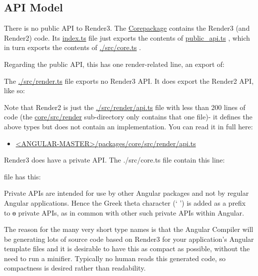 \subsection{API Model}

There is no public API to Render3. The
\url{Corepackage}
contains the Render3 (and
Render2) code. Its
\url{index.ts}
file just exports the contents of
\url{public_api.ts}
, which in
turn exports the contents of
\url{./src/core.ts}
.

Regarding the public API, this has one render-related line, an export of:



The
\url{./src/render.ts}
file exports no Render3 API. It does export the Render2 API, like
so:



Note that Render2 is just the
\url{./src/render/api.ts}
file with less than 200 lines of code
(the
\url{core/src/render}
sub-directory only contains that one file)- it defines the above
types but does not contain an implementation. You can read it in full here:

\begin{itemize}
  \item \href{https://github.com/angular/angular/blob/master/packages/core/src/render/api.ts}
        {<ANGULAR-MASTER>/packages/core/src/render/api.ts}
\end{itemize}

Render3 does have a private API. The ./src/core.ts file contain this line:



file has this:



Private APIs are intended for use by other Angular packages and not by regular
Angular applications. Hence the Greek theta character (‘ ’) is added as a prefix to
ɵ
private APIs, as in common with other such private APIs within Angular.

The reason for the many very short type names is that the Angular Compiler will be
generating lots of source code based on Render3 for your application’s Angular
template files and it is desirable to have this as compact as possible, without the need
to run a minifier. Typically no human reads this generated code, so compactness is
desired rather than readability.

